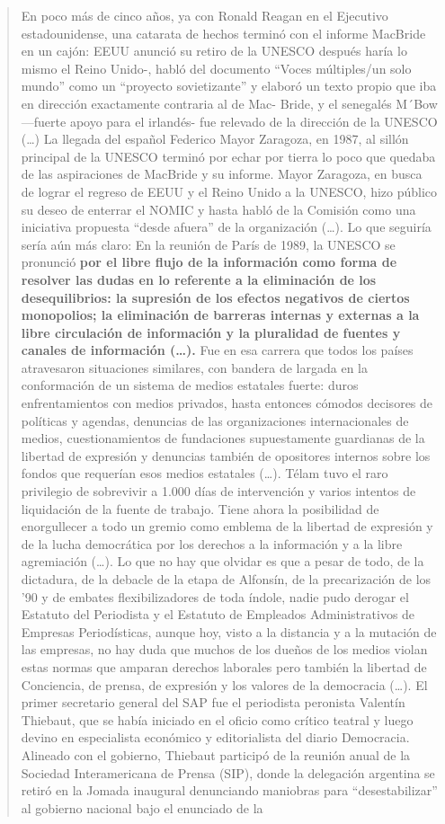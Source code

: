 \begin{quote}
En poco más de cinco años, ya con Ronald Reagan en el Ejecutivo estadounidense, una catarata de hechos terminó con el informe MacBride en un cajón: EEUU anunció su retiro de la UNESCO después haría lo mismo el Reino Unido-, habló del documento ``Voces múltiples/un solo mundo'' como un ``proyecto sovietizante'' y elaboró un texto propio que iba en dirección exactamente contraria al de Mac- Bride, y el senegalés M´Bow ---fuerte apoyo para el irlandés- fue relevado de la dirección de la UNESCO (\ldots) La llegada del español Federico Mayor Zaragoza, en 1987, al sillón principal de la UNESCO terminó por echar por tierra lo poco que quedaba de las aspiraciones de MacBride y su informe. Mayor Zaragoza, en busca de lograr el regreso de EEUU y el Reino Unido a la UNESCO, hizo público su deseo de enterrar el NOMIC y hasta habló de la Comisión como una iniciativa propuesta ``desde afuera'' de la organización (\ldots). Lo que seguiría sería aún más claro: En la reunión de París de 1989, la UNESCO se pronunció \textbf{por el libre flujo de la información como forma de resolver las dudas en lo referente a la eliminación de los desequilibrios: la supresión de los efectos negativos de ciertos monopolios; la eliminación de barreras internas y externas a la libre circulación de información y la pluralidad de fuentes y canales de información (\ldots).} Fue en esa carrera que todos los países atravesaron situaciones similares, con bandera de largada en la conformación de un sistema de medios estatales fuerte: duros enfrentamientos con medios privados, hasta entonces cómodos decisores de políticas y agendas, denuncias de las organizaciones internacionales de medios, cuestionamientos de fundaciones supuestamente guardianas de la libertad de expresión y denuncias también de opositores internos sobre los fondos que requerían esos medios estatales (\ldots). Télam tuvo el raro privilegio de sobrevivir a 1.000 días de intervención y varios intentos de liquidación de la fuente de trabajo. Tiene ahora la posibilidad de enorgullecer a todo un gremio como emblema de la libertad de expresión y de la lucha democrática por los derechos a la información y a la libre agremiación (\ldots). Lo que no hay que olvidar es que a pesar de todo, de la dictadura, de la debacle de la etapa de Alfonsín, de la precarización de los '90 y de embates flexibilizadores de toda índole, nadie pudo derogar el Estatuto del Periodista y el Estatuto de Empleados Administrativos de Empresas Periodísticas, aunque hoy, visto a la distancia y a la mutación de las empresas, no hay duda que muchos de los dueños de los medios violan estas normas que amparan derechos laborales pero también la libertad de Conciencia, de prensa, de expresión y los valores de la democracia (\ldots). El primer secretario general del SAP fue el periodista peronista Valentín Thiebaut, que se había iniciado en el oficio como crítico teatral y luego devino en especialista económico y editorialista del diario Democracia. Alineado con el gobierno, Thiebaut participó de la reunión anual de la Sociedad Interamericana de Prensa (SIP), donde la delegación argentina se retiró en la Jomada inaugural denunciando maniobras para ``desestabilizar'' al gobierno nacional bajo el enunciado de la 
\end{quote}
